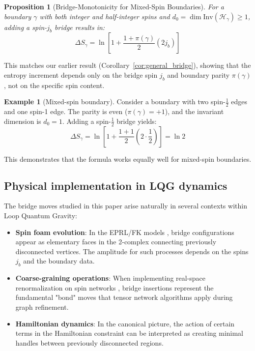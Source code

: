 \documentclass[11pt, a4paper]{article}
\theoremstyle{plain}
\newtheorem{proposition}[theorem]{Proposition}
\theoremstyle{definition}
\newtheorem{example}{Example}
\theoremstyle{remark}
\newcommand{\Inv}{\mathrm{Inv}}
\begin{document}
\begin{proposition}[Bridge-Monotonicity for Mixed-Spin Boundaries]
\label{prop:mixed_spin}
For a boundary $\gamma$ with both integer and half-integer spins and $d_0 = \dim\Inv(\mathcal{H}_{\gamma}) \geq 1$, adding a spin-$j_b$ bridge results in:
\begin{equation}
\Delta S_{\gamma} = \ln\left[1 + \frac{1+\pi(\gamma)}{2}(2j_b)\right]
\end{equation}
\end{proposition}

This matches our earlier result (Corollary~\ref{cor:general_bridge}), showing that the entropy increment depends only on the bridge spin $j_b$ and boundary parity $\pi(\gamma)$, not on the specific spin content.

\begin{example}[Mixed-spin boundary]
Consider a boundary with two spin-$\frac{1}{2}$ edges and one spin-1 edge. The parity is even ($\pi(\gamma)=+1$), and the invariant dimension is $d_0=1$. Adding a spin-$\frac{1}{2}$ bridge yields:
\begin{equation}
\Delta S_{\gamma} = \ln\left[1 + \frac{1+1}{2}(2\cdot\frac{1}{2})\right] = \ln 2
\end{equation}

This demonstrates that the formula works equally well for mixed-spin boundaries.
\end{example}

\subsection{Physical implementation in LQG dynamics}
\label{sec:lqg_dynamics}

The bridge moves studied in this paper arise naturally in several contexts within Loop Quantum Gravity:

\begin{itemize}
\item \textbf{Spin foam evolution}: In the EPRL/FK models \cite{EnglePereira2008,FreidelKrasnov2008}, bridge configurations appear as elementary faces in the 2-complex connecting previously disconnected vertices. The amplitude for such processes depends on the spins $j_b$ and the boundary data.

\item \textbf{Coarse-graining operations}: When implementing real-space renormalization on spin networks \cite{DittrichReview2017,Oriti2008}, bridge insertions represent the fundamental "bond" moves that tensor network algorithms apply during graph refinement.

\item \textbf{Hamiltonian dynamics}: In the canonical picture, the action of certain terms in the Hamiltonian constraint \cite{ThiemannQSD1998} can be interpreted as creating minimal handles between previously disconnected regions.
\end{itemize}
\end{document}
